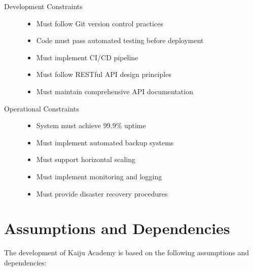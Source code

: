 \documentclass[a4paper, 11pt]{scrreprt}
\begin{document}
\begin{description}
    \item[Development Constraints]
        \begin{itemize}
            \item Must follow Git version control practices
            \item Code must pass automated testing before deployment
            \item Must implement CI/CD pipeline
            \item Must follow RESTful API design principles
            \item Must maintain comprehensive API documentation
        \end{itemize}
    
    \item[Operational Constraints]
        \begin{itemize}
            \item System must achieve 99.9\% uptime
            \item Must implement automated backup systems
            \item Must support horizontal scaling
            \item Must implement monitoring and logging
            \item Must provide disaster recovery procedures
        \end{itemize}
\end{description}

\section{Assumptions and Dependencies}

The development of Kaiju Academy is based on the following assumptions and dependencies:
\end{document}
